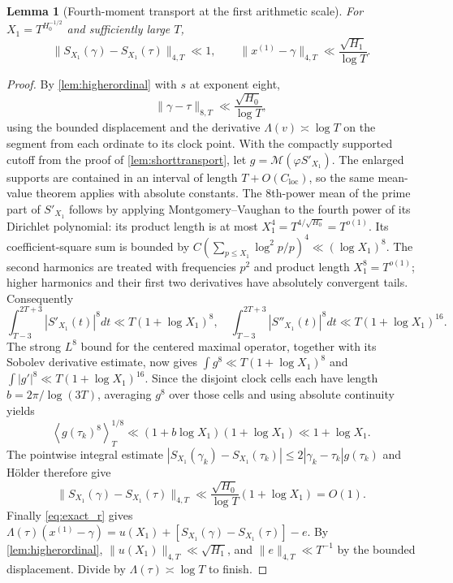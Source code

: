 \documentclass[11pt,reqno]{amsart}
\numberwithin{equation}{section}
\newtheorem{lemma}[theorem]{Lemma}
\newcommand{\av}[1]{\left\langle #1\right\rangle_T}
\newcommand{\Cloc}{C_{\mathrm{loc}}}
\begin{document}
\begin{lemma}[Fourth-moment transport at the first arithmetic scale]
\label{lem:firstL4}
For $X_1=T^{H_0^{-1/2}}$ and sufficiently large $T$,
\begin{equation}\label{eq:firstL4}
\bigl\|S_{X_1}(\gamma)-S_{X_1}(\tau)\bigr\|_{4,T}
\ll 1,
\qquad\bigl\|x^{(1)}-\gamma\bigr\|_{4,T}
\ll\frac{\sqrt{H_1}}{\log T}.
\end{equation}
\end{lemma}
\begin{proof}
By \cref{lem:higherordinal} with $s$ at exponent eight,
\[
\|\gamma-\tau\|_{8,T}\ll\frac{\sqrt{H_0}}{\log T},
\]
using the bounded displacement and the derivative
$\Lambda(v)\asymp\log T$ on the segment from each ordinate to
its clock point.  With the compactly supported cutoff from the
proof of \cref{lem:shorttransport}, let
$g=\mathcal M(\varphi S'_{X_1})$.
The enlarged supports are contained in an interval of length
$T+O(\Cloc)$, so the same mean-value theorem applies
with absolute constants. The $8$th-power mean of the prime
part of $S'_{X_1}$ follows
by applying Montgomery--Vaughan to the fourth power of its
Dirichlet polynomial: its product length is at most
$X_1^4=T^{4/\sqrt{H_0}}=T^{o(1)}$.
Its coefficient-square sum is bounded by
$C(\sum_{p\le X_1}\log^2p/p)^4\ll(\log X_1)^8$.
The second harmonics are treated with frequencies $p^2$ and
product length $X_1^8=T^{o(1)}$; higher harmonics and their
first two derivatives have absolutely convergent tails.
Consequently
\begin{equation}\label{eq:continuous8}
\int_{T-3}^{2T+3}|S'_{X_1}(t)|^8dt
 \ll T(1+\log X_1)^8,
\quad
\int_{T-3}^{2T+3}|S''_{X_1}(t)|^8dt
 \ll T(1+\log X_1)^{16}.
\end{equation}
The strong $L^8$ bound for the centered maximal operator,
together with its Sobolev derivative estimate, now gives
$\int g^8\ll T(1+\log X_1)^8$ and
$\int|g'|^8\ll T(1+\log X_1)^{16}$.
Since the disjoint clock cells each have length
$b=2\pi/\log(3T)$, averaging $g^8$ over those cells and
using absolute continuity yields
\[
\av{g(\tau_k)^8}^{1/8}
 \ll (1+b\log X_1)(1+\log X_1)
 \ll 1+\log X_1.
\]
The pointwise integral estimate
$|S_{X_1}(\gamma_k)-S_{X_1}(\tau_k)|
\le2|\gamma_k-\tau_k|g(\tau_k)$ and H\"older
therefore give
\[
\bigl\|S_{X_1}(\gamma)-S_{X_1}(\tau)\bigr\|_{4,T}
 \ll \frac{\sqrt{H_0}}{\log T}(1+\log X_1)=O(1).
\]
Finally \eqref{eq:exact_r} gives
$\Lambda(\tau)(x^{(1)}-\gamma)=
u(X_1)+
[S_{X_1}(\gamma)-S_{X_1}(\tau)]-e$.
By \cref{lem:higherordinal}, $\|u(X_1)\|_{4,T}
\ll\sqrt{H_1}$, and $\|e\|_{4,T}\ll T^{-1}$ by the
bounded displacement. Divide by $\Lambda(\tau)\asymp\log T$
to finish.
\end{proof}
\end{document}
